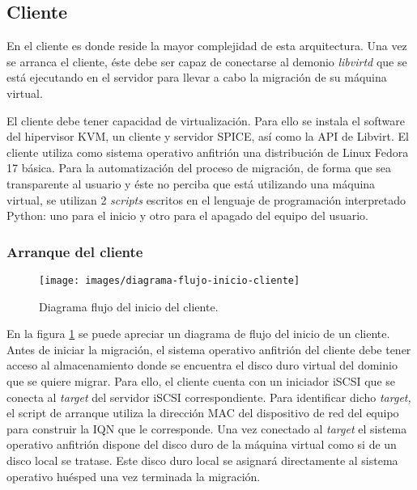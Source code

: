 \documentclass[spanisheDIVcalc,twoside,parskip-,pointlessnumbers,final]{scrbook}
\begin{document}
\subsection{Cliente\label{sub:Cliente}}

En el cliente es donde reside la mayor complejidad de esta arquitectura.
Una vez se arranca el cliente, éste debe ser capaz de conectarse al
demonio \emph{libvirtd }que se está ejecutando en el servidor para
llevar a cabo la migración de su máquina virtual.

El cliente debe tener capacidad de virtualización. Para ello se instala
el software del hipervisor KVM, un cliente y servidor SPICE, así como
la API de Libvirt. El cliente utiliza como sistema operativo anfitrión
una distribución de Linux Fedora 17 básica. Para la automatización
del proceso de migración, de forma que sea transparente al usuario
y éste no perciba que está utilizando una máquina virtual, se utilizan
2 \emph{scripts} escritos en el lenguaje de programación interpretado
Python: uno para el inicio y otro para el apagado del equipo del usuario.


\subsubsection{Arranque del cliente}

\begin{figure}[htpb]
\begin{centering}
\texttt{[image: images/diagrama-flujo-inicio-cliente]}
\par\end{centering}

\caption{Diagrama flujo del inicio del cliente.}
\label{diagrama-flujo-inicio}

\end{figure}


En la figura \ref{diagrama-flujo-inicio} se puede apreciar un diagrama
de flujo del inicio de un cliente. Antes de iniciar la migración,
el sistema operativo anfitrión del cliente debe tener acceso al almacenamiento
donde se encuentra el disco duro virtual del dominio que se quiere
migrar. Para ello, el cliente cuenta con un iniciador iSCSI que se
conecta al \emph{target }del servidor iSCSI correspondiente. Para
identificar dicho \emph{target,} el script de arranque utiliza la
dirección MAC del dispositivo de red del equipo para construir la
IQN que le corresponde. Una vez conectado al \emph{target} el sistema
operativo anfitrión dispone del disco duro de la máquina virtual como
si de un disco local se tratase. Este disco duro local se asignará
directamente al sistema operativo huésped una vez terminada la migración.
\end{document}
